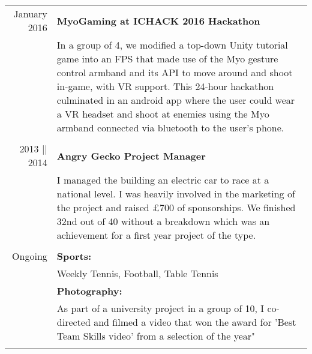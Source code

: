 \documentclass[a4paper,10pt]{article}
\begin{document}
	\begin{tabular}{r|p{12cm}}
		January 2016 & \textbf{MyoGaming at ICHACK 2016 Hackathon} \\&In a group of 4, we modified a top-down Unity tutorial game into an FPS that made use of the Myo gesture control armband and its API to move around and shoot in-game, with VR support.
		This 24-hour hackathon culminated in an android app where the user could wear a VR headset and shoot at enemies using the Myo armband connected via bluetooth to the user's phone.
		\\\multicolumn{2}{c}{} \\
		
		2013 || 2014 & \textbf{Angry Gecko Project Manager} \\& I managed the building an electric car to race at a national level. I was heavily involved in the marketing 		of the project and raised £700 of sponsorships. We finished 32nd out of 40 without a breakdown which was an achievement for a first year project of the type. 
		\\\multicolumn{2}{c}{} \\
		
		Ongoing & \textbf{Sports:} \\& Weekly Tennis, Football, Table Tennis \\& \textbf{Photography:} \\& As part of a university project in a group of 10, I co-directed and filmed a video that won the award for 'Best Team Skills video' from a selection of the year"
		\\\multicolumn{2}{c}{} \\
		
	\end{tabular}
	
	
	
	
\end{document}

